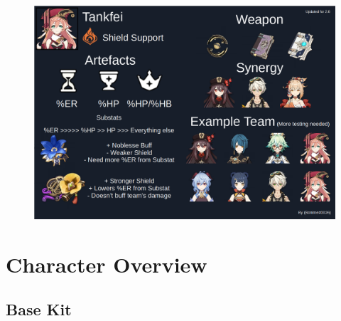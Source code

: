 \documentclass[11pt]{article}
\begin{document}
\begin{figure}[h]
\includegraphics[scale= 0.235]{Tankfei.png} 
\centering
\end{figure}

\newpage

\section{Character Overview}

\subsection{Base Kit}
\end{document}
